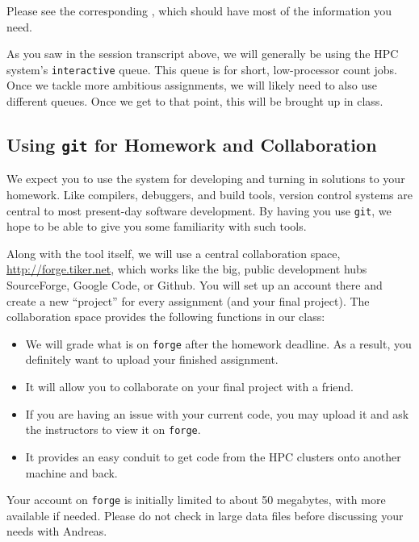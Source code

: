 \documentclass[11pt]{article}
\begin{document}
\begin{enumerate}
Please see the corresponding
, which should have most of the information you need.

As you saw in the session transcript above, we will generally be using
the HPC system's \texttt{interactive} queue. This queue is for short,
low-processor count jobs. Once we tackle more ambitious assignments,
we will likely need to also use different queues. Once we get to that
point, this will be brought up in class.

\subsection*{Using \texttt{git} for Homework and Collaboration}

We expect you to use the
 system  for
developing and turning in solutions to your homework. Like compilers,
debuggers, and build tools, version control systems are central to
most present-day software development. By having you use \texttt{git},
we hope to be able to give you some familiarity with such tools.

Along with the tool itself, we will use a central collaboration space,
\url{http://forge.tiker.net}, which works like the big, public
development hubs SourceForge, Google Code, or Github. You will set up
an account there and create a new ``project'' for every assignment
(and your final project). The collaboration space provides the
following functions in our class:
\begin{itemize}
  \item We will grade what is on \texttt{forge} after the homework
  deadline. As a result, you definitely want to upload your finished
  assignment.
  \item It will allow you to collaborate on your final project with a friend.
  \item If you are having an issue with your current code, you may
  upload it and ask the instructors to view it on \texttt{forge}.
  \item It provides an easy conduit to get code from the HPC clusters
  onto another machine and back.
\end{itemize}

\begin{note}
Your account on \texttt{forge} is initially limited to
about 50 megabytes, with more available if needed. Please do not check
in large data files before discussing your needs with Andreas.


\end{note}
\end{enumerate}
\end{document}
